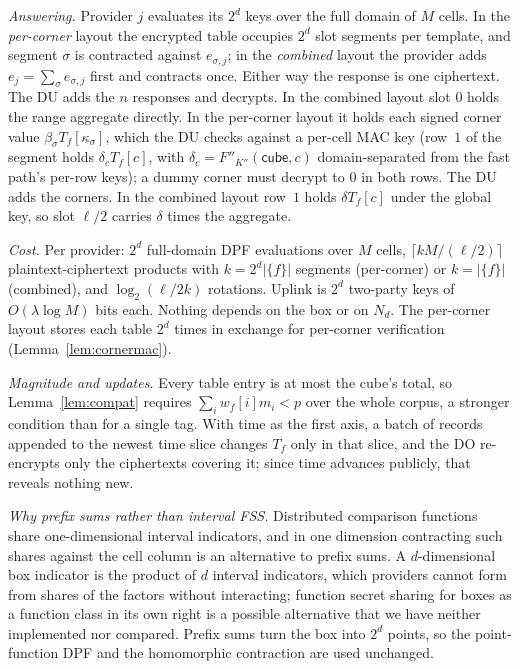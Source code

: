 \documentclass[a4paper,fleqn]{cas-sc}
\newif\ifauthorchecks
\newcommand{\authorcheck}[1]{\ifauthorchecks{\color{red}\textsf{[Authors: #1]}}\fi}
\begin{document}
\emph{Answering.} Provider $j$ evaluates its $2^d$ keys over the full domain of
$M$ cells. In the \emph{per-corner} layout the encrypted table occupies $2^d$
slot segments per template, and segment $\sigma$ is contracted against
$e_{\sigma,j}$; in the \emph{combined} layout the provider adds
$e_j=\sum_\sigma e_{\sigma,j}$ first and contracts once. Either way the response
is one ciphertext. The DU adds the $n$ responses and decrypts. In the combined
layout slot $0$ holds the range aggregate directly. In the per-corner layout it
holds each signed corner value $\beta_\sigma T_f[\kappa_\sigma]$, which the DU
checks against a per-cell MAC key (row~$1$ of the segment holds
$\delta_c T_f[c]$, with $\delta_c=F''_{K''}(\mathsf{cube},c)$ domain-separated
from the fast path's per-row keys); a dummy corner must decrypt to $0$ in both
rows. The DU adds the corners. In the combined layout row~$1$ holds
$\delta T_f[c]$ under the global key, so slot $\ell/2$ carries $\delta$ times
the aggregate.

\emph{Cost.} Per provider: $2^d$ full-domain DPF evaluations over $M$ cells,
$\lceil kM/(\ell/2)\rceil$ plaintext-ciphertext products with $k=2^d|\{f\}|$
segments (per-corner) or $k=|\{f\}|$ (combined), and $\log_2(\ell/2k)$
rotations. Uplink is $2^d$ two-party keys of $O(\lambda\log M)$ bits each.
Nothing depends on the box or on $N_d$. The per-corner layout stores each
table $2^d$ times in exchange for per-corner verification
(Lemma~\ref{lem:cornermac}).

\emph{Magnitude and updates.} Every table entry is at most the cube's total,
so Lemma~\ref{lem:compat} requires $\sum_i w_f[i]m_i<p$ over the whole corpus,
a stronger condition than for a single tag. With time as the first axis, a
batch of records appended to the newest time slice changes $T_f$ only in that
slice, and the DO re-encrypts only the ciphertexts covering it; since time
advances publicly, that reveals nothing new.

\emph{Why prefix sums rather than interval FSS.} Distributed comparison
functions \citep{boyle2016function} share one-dimensional interval indicators,
and in one dimension contracting such shares against the cell column is an
alternative to prefix sums. A $d$-dimensional box indicator is the product of
$d$ interval indicators, which providers cannot form from shares of the
factors without interacting; function secret sharing for boxes as a function
class in its own right is a possible alternative that we have neither
implemented nor compared. Prefix sums turn the box into $2^d$ points, so the
point-function DPF and the homomorphic contraction are used unchanged.
\authorcheck{Check the FSS literature for multi-dimensional interval
functions (key size, evaluation cost) and compare.}
\end{document}
